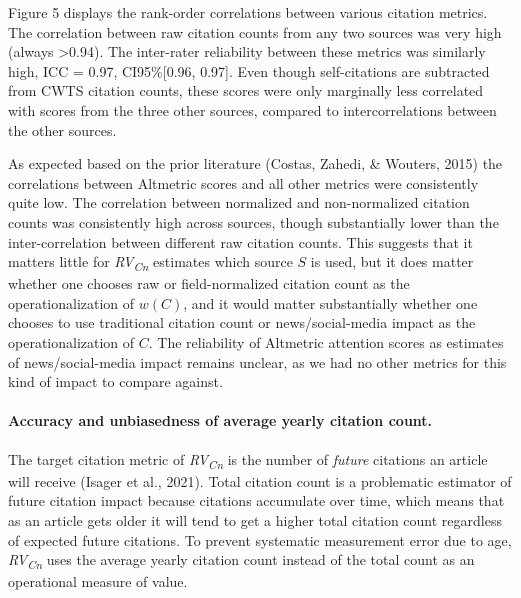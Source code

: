\documentclass[
  english,
  man,floatsintext]{apa6}
\let\oldparagraph\paragraph
\renewcommand{\paragraph}[1]{\oldparagraph{#1}\mbox{}}
\begin{document}
Figure 5 displays the rank-order correlations between various citation metrics. The correlation between raw citation counts from any two sources was very high (always \textgreater0.94). The inter-rater reliability between these metrics was similarly high, ICC = 0.97, CI95\%{[}0.96, 0.97{]}. Even though self-citations are subtracted from CWTS citation counts, these scores were only marginally less correlated with scores from the three other sources, compared to intercorrelations between the other sources.

As expected based on the prior literature (Costas, Zahedi, \& Wouters, 2015) the correlations between Altmetric scores and all other metrics were consistently quite low. The correlation between normalized and non-normalized citation counts was consistently high across sources, though substantially lower than the inter-correlation between different raw citation counts. This suggests that it matters little for \emph{RV\textsubscript{Cn}} estimates which source \(S\) is used, but it does matter whether one chooses raw or field-normalized citation count as the operationalization of \(w(C)\), and it would matter substantially whether one chooses to use traditional citation count or news/social-media impact as the operationalization of \(C\). The reliability of Altmetric attention scores as estimates of news/social-media impact remains unclear, as we had no other metrics for this kind of impact to compare against.

\hypertarget{accuracy-and-unbiasedness-of-average-yearly-citation-count.}{%
\paragraph{Accuracy and unbiasedness of average yearly citation count.}\label{accuracy-and-unbiasedness-of-average-yearly-citation-count.}}

The target citation metric of \emph{RV\textsubscript{Cn}} is the number of \emph{future} citations an article will receive (Isager et al., 2021). Total citation count is a problematic estimator of future citation impact because citations accumulate over time, which means that as an article gets older it will tend to get a higher total citation count regardless of expected future citations. To prevent systematic measurement error due to age, \emph{RV\textsubscript{Cn}} uses the average yearly citation count instead of the total count as an operational measure of value.
\end{document}
